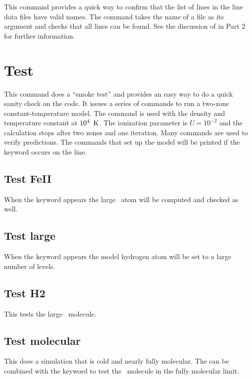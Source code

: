 This command provides a quick way to confirm that the list of lines in
the line data files have valid names.
The command takes the name of a file
as its argument and checks that all lines can be found.
See the discussion
of  in Part 2 for further information.

\section{Test}

This command does a ``smoke test'' and provides an easy way to do a quick
sanity check on the code.
It issues a series of commands to run a two-zone
constant-temperature model.
The  command is used with the density
and temperature constant at $10^4\ \K$.
The ionization parameter is $U = 10^{-2}$ and the
calculation stops after two zones and one iteration.
Many  commands
are used to verify predictions.
The commands that set up the model will
be printed if the keyword  occurs on the line.

\subsection{Test FeII}

When the  keyword appears the large \feii\ atom
will be computed and checked as well.

\subsection{Test large}

When the  keyword appears the model hydrogen atom
will be set to a large number of levels.

\subsection{Test H2}

This tests the large \htwo\ molecule.

\subsection{Test molecular}

This does a simulation that is cold and nearly fully molecular.
The
can be combined with the  keyword to test the
\htwo\ molecule in the fully molecular limit.

